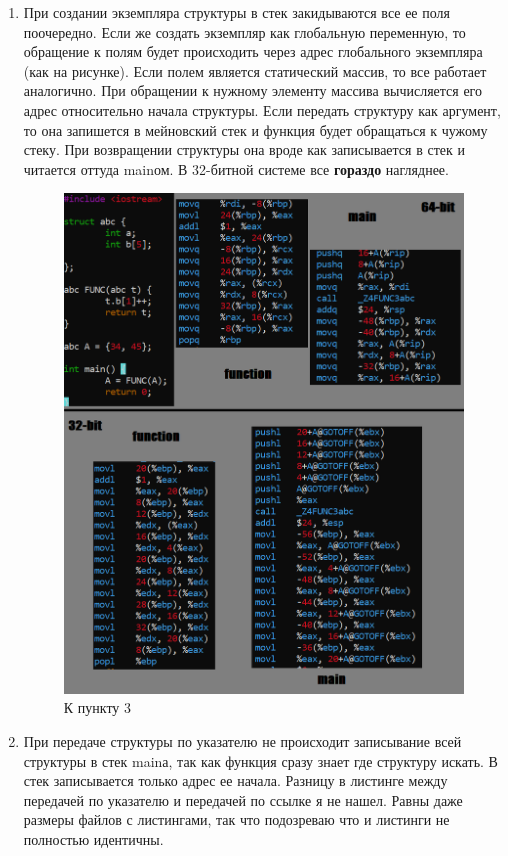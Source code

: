\documentclass[a4paper,12pt]{article}
\begin{document}
\begin{enumerate}
\item При создании экземпляра структуры в стек закидываются все ее поля поочередно. Если же создать экземпляр как глобальную переменную, то обращение к полям будет происходить через адрес глобального экземпляра (как на рисунке). Если полем является статический массив, то все работает аналогично. При обращении к нужному элементу массива вычисляется его адрес относительно начала структуры.
Если передать структуру как аргумент, то она запишется в мейновский стек и функция будет обращаться к чужому стеку. При возвращении структуры она вроде как записывается в стек и читается оттуда mainом.
В 32-битной системе все \textbf{гораздо} нагляднее.

\begin{figure}[H]
  \centering
  \includegraphics[width=0.8\linewidth]{images/asm2_3.png}
  \caption{К пункту 3}
\end{figure}

\item При передаче структуры по указателю не происходит записывание всей структуры в стек mainа, так как функция сразу знает где структуру искать. В стек записывается только адрес ее начала. Разницу в листинге между передачей по указателю и передачей по ссылке я не нашел. Равны даже размеры файлов с листингами, так что подозреваю что и листинги не полностью идентичны.


\end{enumerate}
\end{document}
